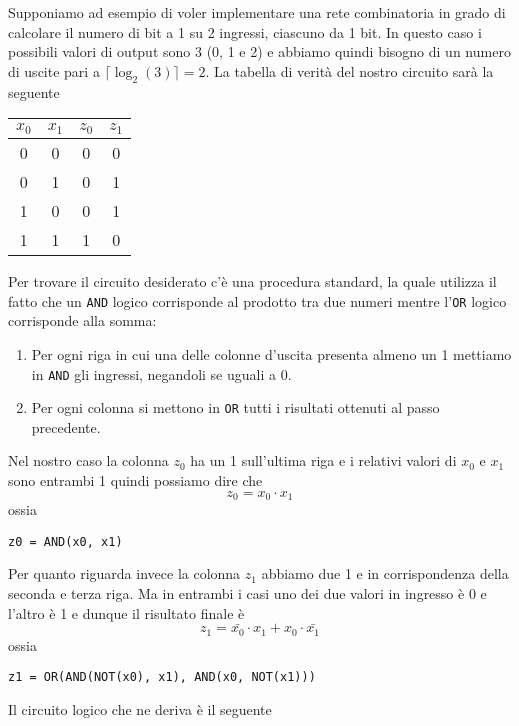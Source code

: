 Supponiamo ad esempio di voler implementare una rete combinatoria in grado di calcolare il numero
di bit a 1 su 2 ingressi, ciascuno da 1 bit. In questo caso i possibili valori di output sono 3 (0,
1 e 2) e abbiamo quindi bisogno di un numero di uscite pari a $\lceil \log_2 (3) \rceil = 2$. La
tabella di verità del nostro circuito sarà la seguente
\begin{center}
	\begin{tabular}{c c | c c}
		$x_0$ & $x_1$ & $z_0$ & $z_1$ \\ \hline
		0     & 0     & 0     & 0     \\
		0     & 1     & 0     & 1     \\
		1     & 0     & 0     & 1     \\
		1     & 1     & 1     & 0
	\end{tabular}
\end{center}
Per trovare il circuito desiderato c'è una procedura standard, la quale utilizza il fatto che un
\verb|AND| logico corrisponde al prodotto tra due numeri mentre l'\verb|OR| logico corrisponde alla
somma:
\begin{enumerate}
	\item Per ogni riga in cui una delle colonne d'uscita presenta almeno un 1 mettiamo in
	      \verb|AND| gli ingressi, negandoli se uguali a 0.
	\item Per ogni colonna si mettono in \verb|OR| tutti i risultati ottenuti al passo precedente.
\end{enumerate}
Nel nostro caso la colonna $z_0$ ha un 1 sull'ultima riga e i relativi valori di $x_0$ e $x_1$ sono
entrambi 1 quindi possiamo dire che
\[ z_0 = x_0 \cdot x_1 \]
ossia
\begin{center}
	\verb|z0 = AND(x0, x1)|
\end{center}
Per quanto riguarda invece la colonna $z_1$ abbiamo due 1 e in corrispondenza della seconda e terza
riga. Ma in entrambi i casi uno dei due valori in ingresso è 0 e l'altro è 1 e dunque il risultato
finale è
\[ z_1 = \bar{x_0} \cdot x_1 + x_0 \cdot \bar{x_1} \]
ossia
\begin{center}
	\verb|z1 = OR(AND(NOT(x0), x1), AND(x0, NOT(x1)))|
\end{center}
Il circuito logico che ne deriva è il seguente
